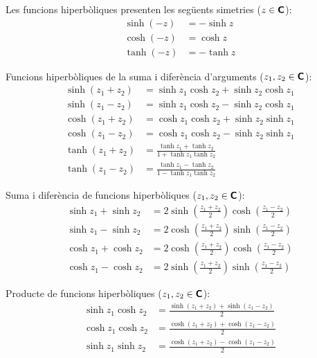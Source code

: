Les funcions hiperbòliques presenten les següents simetries
($z\in{\ensuremath{\boldsymbol{\mathsf{C}}}}$):
\begin{subequations}
\begin{align}
    \sinh (-z) &= -\sinh z \\
    \cosh (-z) &= \cosh z\\
    \tanh (-z) &= -\tanh z
\end{align}
\end{subequations}

Funcions hiperbòliques de la suma i diferència d'arguments ($z_1,
z_2\in{\ensuremath{\boldsymbol{\mathsf{C}}}}$):
\begin{subequations}
\begin{align}
    \sinh(z_1+z_2) &= \sinh z_1 \cosh z_2 + \sinh z_2\cosh z_1\\[1ex]
    \sinh(z_1-z_2) &= \sinh z_1 \cosh z_2 - \sinh z_2\cosh z_1\\[1ex]
    \cosh(z_1+z_2) &= \cosh z_1 \cosh z_2 + \sinh z_2\sinh z_1\\[1ex]
    \cosh(z_1-z_2) &= \cosh z_1 \cosh z_2 - \sinh z_2\sinh z_1\\[1ex]
    \tanh(z_1+z_2) &=\frac{\tanh z_1+\tanh z_2}{1+\tanh z_1\tanh z_2}\\[1ex]
    \tanh(z_1-z_2) &=\frac{\tanh z_1-\tanh z_2}{1-\tanh z_1\tanh z_2}
\end{align}
\end{subequations}

Suma i diferència de funcions hiperbòliques ($z_1,
z_2\in{\ensuremath{\boldsymbol{\mathsf{C}}}}$):
\begin{subequations}
\begin{align}
    \sinh z_1+\sinh z_2 &= 2 \sinh\left(\frac{z_1+z_2}{2}\right)
    \cosh\left(\frac{z_1-z_2}{2}\right)\\[1ex]
    \sinh z_1-\sinh z_2 &= 2 \cosh\left(\frac{z_1+z_2}{2}\right)
    \sinh\left(\frac{z_1-z_2}{2}\right)\\[1ex]
    \cosh z_1+\cosh z_2 &= 2 \cosh\left(\frac{z_1+z_2}{2}\right)
    \cosh\left(\frac{z_1-z_2}{2}\right)\\[1ex]
    \cosh z_1-\cosh z_2 &= 2 \sinh\left(\frac{z_1+z_2}{2}\right)
    \sinh\left(\frac{z_1-z_2}{2}\right)
\end{align}
\end{subequations}

Producte de funcions hiperbòliques ($z_1, z_2\in{\ensuremath{\boldsymbol{\mathsf{C}}}}$):
\begin{subequations}
\begin{align}
    \sinh z_1 \cosh z_2 &=
    \frac{\sinh(z_1+z_2)+\sinh(z_1-z_2)}{2}\\[1ex]
    \cosh z_1 \cosh z_2 &=
    \frac{\cosh(z_1+z_2)+\cosh(z_1-z_2)}{2}\\[1ex]
    \sinh z_1 \sinh z_2 &=
    \frac{\cosh(z_1+z_2)-\cosh(z_1-z_2)}{2}
\end{align}
\end{subequations}
